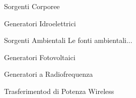 \begin{multicols}{2}
\begin{section}{Sorgenti Corporee}
\begin{subsection}{Generatori Idroelettrici}
   \end{subsection}
\end{section}


\begin{section}{Sorgenti Ambientali}
    Le fonti ambientali...
    \begin{subsection}{Generatori Fotovoltaici}
    
    \end{subsection}

    \begin{subsection}{Generatori a Radiofrequenza}
    
    \end{subsection}

    \begin{subsection}{Trasferimentod di Potenza Wireless}
    
    \end{subsection}
\end{section}

\end{multicols}